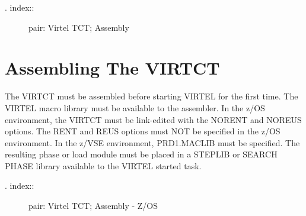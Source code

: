 \documentclass[letterpaper,10pt,english]{sphinxmanual}
\begin{document}
\begin{sphinxVerbatim}[commandchars=\\\{\}]
 
   
   
   
\end{sphinxVerbatim}

\begin{description}
\item[{. index::}] \leavevmode
pair: Virtel TCT; Assembly

\end{description}


\section{Assembling The VIRTCT}
\label{\detokenize{Installation_Guide:id6}}
The VIRTCT must be assembled before starting VIRTEL for the first time. The VIRTEL macro library must be available to the assembler. In the z/OS environment, the VIRTCT must be link-edited with the NORENT and NOREUS options. The RENT and REUS options must NOT be specified in the z/OS environment. In the z/VSE environment, PRD1.MACLIB must be specified. The resulting phase or load module must be placed in a STEPLIB or SEARCH PHASE library available to the VIRTEL started task.
\begin{description}
\item[{. index::}] \leavevmode
pair: Virtel TCT; Assembly - Z/OS

\end{description}
\end{document}
